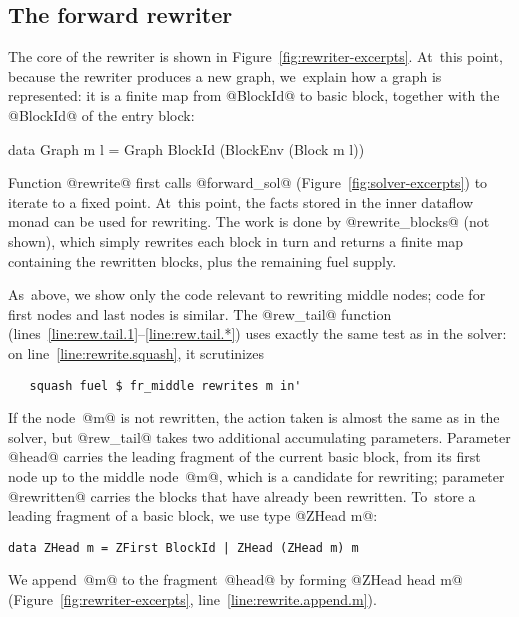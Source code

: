 \documentclass[blockstyle,preprint,natbib,nocopyrightspace]{sigplanconf}
\newcommand\lineref[1]{line~\ref{line:#1}}
\newcommand\linerangeref[2]{\mbox{lines~\ref{line:#1}--\ref{line:#2}}}
\newcommand\seclabel[1]{\label{sec:#1}}
\newcommand\figref[1]{Figure~\ref{fig:#1}}
\begin{document}
\subsection{The forward rewriter}

\seclabel{forward-rewriter}

The core of the rewriter is shown in \figref{rewriter-excerpts}.
At~this point, because the rewriter produces a new graph, we~explain
how a graph is represented: it is a finite map from  @BlockId@
  to basic block, together with the @BlockId@ of the entry block:
\begin{code}
data Graph m l = Graph BlockId (BlockEnv (Block m l))
\end{code}
Function @rewrite@ first calls @forward_sol@
(\figref{solver-excerpts}) to iterate to a fixed point.
At~this point, the facts stored in the inner dataflow monad can be
used for rewriting.
The work is done by @rewrite_blocks@ (not shown), which simply
rewrites each block in turn and returns a finite map containing the
rewritten blocks, plus the remaining fuel supply.

As~above, we show only the code relevant to rewriting middle nodes;
code for first nodes and last nodes is similar.
The @rew_tail@ function (\linerangeref{rew.tail.1}{rew.tail.*}) uses
exactly the same test as in the solver: on \lineref{rewrite.squash},
it scrutinizes
\begin{verbatim}
   squash fuel $ fr_middle rewrites m in'
\end{verbatim}
If the node~@m@ is not rewritten, the action taken is almost the same
as in the solver, but @rew_tail@ takes two 
 additional accumulating parameters.
Parameter @head@ carries
the leading fragment of the current basic block,
from its first node up to the middle node~@m@, which is
a candidate for rewriting;
parameter @rewritten@ carries the blocks that have already been
rewritten.
%
To~store a leading fragment of a basic block, we use type @ZHead m@:
\begin{verbatim} 
data ZHead m = ZFirst BlockId | ZHead (ZHead m) m
\end{verbatim}
We append~@m@ to the
fragment~@head@ by forming @ZHead head m@ 
(\figref{rewriter-excerpts}, \lineref{rewrite.append.m}). 
\end{document}
